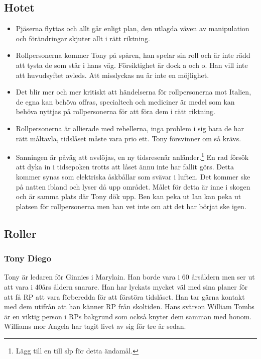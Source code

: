 \documentclass[a5paper,10pt]{report}
\begin{document}
\subsection{Hotet}
\begin{itemize}
  \item[Låg] Pjäserna flyttas och allt går enligt plan, den utlagda väven av manipulation och förändringar skjuter allt i rätt riktning.
  \item[1:a växeln] Rollpersonerna kommer Tony på spåren, han spelar sin roll och är inte rädd att tysta de som står i hans väg. Försiktighet är dock a och o. Han vill inte att huvudsyftet avleds. Att misslyckas nu är inte en möjlighet.
  \item[2:a växeln] Det blir mer och mer kritiskt att händelserna för rollpersonerna mot Italien, de egna kan behöva offras, specialtech och mediciner är medel som kan behöva nyttjas på rollpersonerna för att föra dem i rätt riktning.
  \item[3:e växeln] Rollpersonerna är allierade med rebellerna, inga problem i sig bara de har rätt måltavla, tidslåset måste vara prio ett. Tony försvinner om så krävs.
  \item[Overdrive] Sanningen är påväg att avslöjas, en ny tidsresenär anländer.\footnote{Lägg till en till slp för detta ändamål.} En rad försök att dyka in i tidsepoken trotts att låset ännu inte har fallit görs. Detta kommer synas som elektriska åskbållar som svävar i luften. Det kommer ske på natten ibland och lyser då upp området. Målet för detta är inne i skogen och är samma plats där Tony dök upp. Ben kan peka ut Ian kan peka ut platsen för rollpersonerna men han vet inte om att det har börjat ske igen.
\end{itemize}
\subsection{Roller}
\subsubsection{Tony Diego}
Tony är ledaren för Ginnies i Marylain. Han borde vara i 60 årsåldern men ser ut att vara i 40års åldern snarare. Han har lyckats mycket väl med sina planer för att få RP att vara förberedda för att förstöra tidslåset. Han tar gärna kontakt med dem utifrån att han känner RP från skoltiden. Hans svärson William Tombs är en viktig person i RPs bakgrund som också knyter dem samman med honom. Williams mor Angela har tagit livet av sig för tre år sedan.
\end{document}
